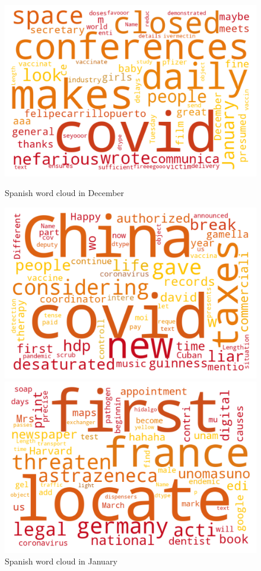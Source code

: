\begin{landscape}
\begin{figure}[!htb]
  \includegraphics[width=\linewidth]{December es word cloud.png}
  \caption{Spanish word cloud in December}\label{fig:decemberes}
\endminipage\hfill
{}
  \includegraphics[width=\linewidth]{January es word cloud.png}
  \caption{Spanish word cloud in January}\label{fig:januaryes}
\endminipage\hfill
{}
  \includegraphics[width=\linewidth]{February es word cloud.png}

\end{figure}
\end{landscape}
